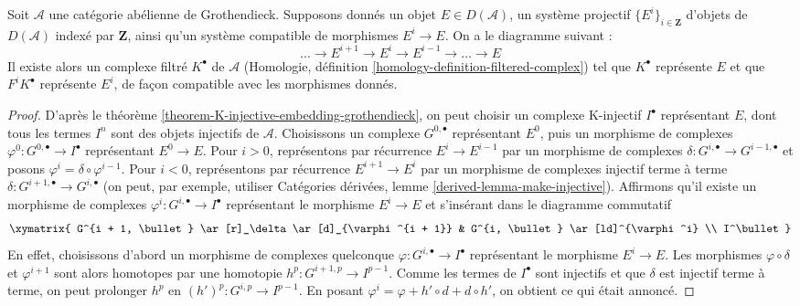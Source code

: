 \begin{lemma}
\label{lemma-represent-by-filtered-complex}
Soit $\mathcal{A}$ une catégorie abélienne de Grothendieck. Supposons donnés
un objet $E \in D(\mathcal{A})$, un système projectif
$\{E^i\}_{i \in \mathbf{Z}}$ d'objets de $D(\mathcal{A})$ indexé par
$\mathbf{Z}$, ainsi qu'un système compatible de morphismes $E^i \to E$.
On a le diagramme suivant :
$$
\ldots \to E^{i + 1} \to E^i \to E^{i - 1} \to \ldots \to E
$$
Il existe alors un complexe filtré $K^\bullet$ de $\mathcal{A}$
(Homologie, définition \ref{homology-definition-filtered-complex}) tel que
$K^\bullet$ représente $E$ et que $F^iK^\bullet$ représente $E^i$, de façon
compatible avec les morphismes donnés.
\end{lemma}

\begin{proof}
D'après le théorème \ref{theorem-K-injective-embedding-grothendieck}, on peut
choisir un complexe K-injectif $I^\bullet$ représentant $E$, dont tous les
termes $I^n$ sont des objets injectifs de $\mathcal{A}$.
Choisissons un complexe $G^{0, \bullet}$ représentant $E^0$, puis un
morphisme de complexes $\varphi^0 : G^{0, \bullet} \to I^\bullet$
représentant $E^0 \to E$.
Pour $i > 0$, représentons par récurrence $E^i \to E^{i - 1}$ par un
morphisme de complexes
$\delta : G^{i, \bullet} \to G^{i - 1, \bullet}$
et posons $\varphi^i = \delta \circ \varphi^{i - 1}$.
Pour $i < 0$, représentons par récurrence $E^{i + 1} \to E^i$ par un
morphisme de complexes injectif terme à terme
$\delta : G^{i + 1, \bullet} \to G^{i, \bullet}$
(on peut, par exemple, utiliser Catégories dérivées, lemme
\ref{derived-lemma-make-injective}).
Affirmons qu'il existe un morphisme de complexes
$\varphi^i : G^{i, \bullet} \to I^\bullet$ représentant le morphisme
$E^i \to E$ et s'insérant dans le diagramme commutatif
$$
\xymatrix{
G^{i + 1, \bullet} \ar[r]_\delta \ar[d]_{\varphi^{i + 1}} &
G^{i, \bullet} \ar[ld]^{\varphi^i} \\
I^\bullet
}
$$
En effet, choisissons d'abord un morphisme de complexes quelconque
$\varphi : G^{i, \bullet} \to I^\bullet$ représentant le morphisme
$E^i \to E$. Les morphismes $\varphi \circ \delta$ et
$\varphi^{i + 1}$ sont alors homotopes par une homotopie
$h^p : G^{i + 1, p} \to I^{p - 1}$. Comme les termes de $I^\bullet$ sont
injectifs et que $\delta$ est injectif terme à terme, on peut prolonger
$h^p$ en $(h')^p : G^{i, p} \to I^{p - 1}$. En posant
$\varphi^i = \varphi + h' \circ d + d \circ h'$, on obtient ce qui était
annoncé.


\end{proof}
